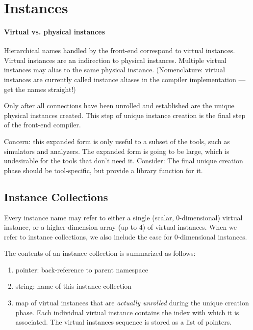 
\chapter{Instances}
\label{sec:instance}

\subsubsection{Virtual vs. physical instances}

Hierarchical names handled by the front-end correspond to virtual instances.  
Virtual instances are an indirection to physical instances.  
Multiple virtual instances may alias to the same physical instance.  
(Nomenclature: virtual instances are currently called instance aliases
	in the compiler implementation --- get the names straight!)

Only after all connections have been unrolled and established are the 
unique physical instances created.  
This step of unique instance creation is the final step of the 
front-end compiler.  

Concern: this expanded form is only useful to a subset of the tools, 
such as simulators and analyzers.  
The expanded form is going to be large, which is undesirable for 
the tools that don't need it.  
Consider: The final unique creation phase should be tool-specific, 
but provide a library function for it.  

\section{Instance Collections}
\label{sec:instance:collection}

Every instance name may refer to either a single (scalar, 0-dimensional)
virtual instance, or a higher-dimension array (up to 4) of virtual instances.  
When we refer to instance collections, we also include the case for
0-dimensional instances.  

The contents of an instance collection is summarized as follows:

\begin{enumerate}
\item pointer: back-reference to parent namespace
\item string: name of this instance collection
\item map of virtual instances that are 
	\emph{actually unrolled} during the unique creation phase.  
	Each individual virtual instance contains
	the index with which it is associated.
	The virtual instances sequence is stored as a list of pointers.  
\end{enumerate}

